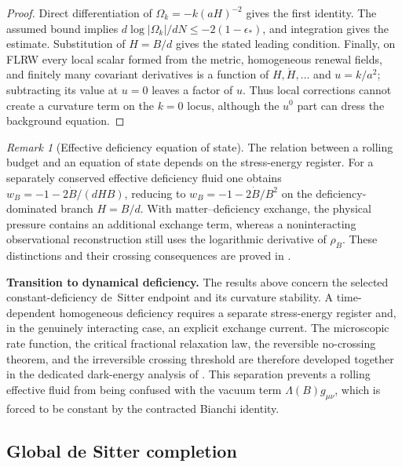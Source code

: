 \documentclass[11pt]{article}
\theoremstyle{definition}
\theoremstyle{remark}
\newtheorem{remark}[theorem]{Remark}
\begin{document}
\begin{proof}
Direct differentiation of $\Omega_k=-k(aH)^{-2}$ gives the first identity.
The assumed bound implies
$d\log|\Omega_k|/dN\le-2(1-\epsilon_*)$, and integration gives the estimate.
Substitution of $H=B/d$ gives the stated leading condition.  Finally, on FLRW
every local scalar formed from the metric, homogeneous renewal fields, and
finitely many covariant derivatives is a function of
$H,\dot H,\ldots$ and $u=k/a^2$; subtracting its value at $u=0$ leaves a
factor of $u$.  Thus local corrections cannot create a curvature term on the
$k=0$ locus, although the $u^0$ part can dress the background equation.
\end{proof}

\begin{remark}[Effective deficiency equation of state]
\label{rem:deficiency-effective-eos}
The relation between a rolling budget and an equation of state depends on the
stress-energy register.  For a separately conserved effective deficiency fluid
one obtains \(w_B=-1-2\dot B/(dHB)\), reducing to
\(w_B=-1-2\dot B/B^2\) on the deficiency-dominated branch \(H=B/d\).
With matter--deficiency exchange, the physical pressure contains an additional
exchange term, whereas a noninteracting observational reconstruction still
uses the logarithmic derivative of \(\rho_B\).  These distinctions and their
crossing consequences are proved in .
\end{remark}

\medskip
\noindent\textbf{Transition to dynamical deficiency.}
The results above concern the selected constant-deficiency de~Sitter endpoint and
its curvature stability.  A time-dependent homogeneous deficiency requires a
separate stress-energy register and, in the genuinely interacting case, an
explicit exchange current.  The microscopic rate function, the critical
fractional relaxation law, the reversible no-crossing theorem, and the
irreversible crossing threshold are therefore developed together in the
dedicated dark-energy analysis of .  This separation
prevents a rolling effective fluid from being confused with the vacuum term
\(\Lambda(B)g_{\mu\nu}\), which is forced to be constant by the contracted
Bianchi identity.

\subsection{Global de Sitter completion}
\label{subsec:global-desitter-completion}
\end{document}
